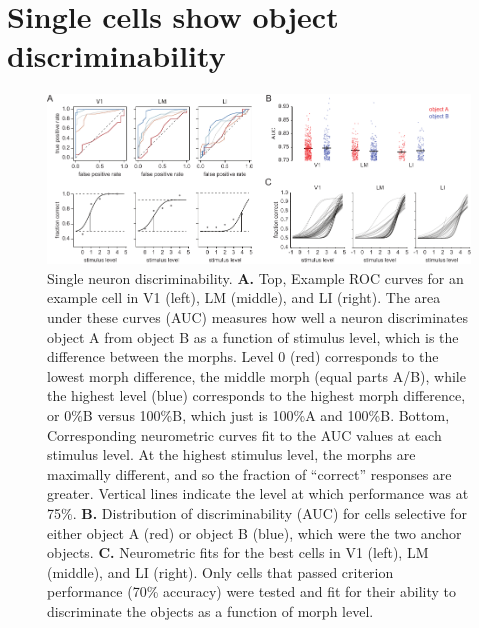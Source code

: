 \section{Single cells show object discriminability}
\begin{figure}[t!]
    \includegraphics[width=\textwidth]{figures/chapter_4/fig_4-3_neurometric/fig_4-3_neurometric.pdf}
    \caption[Single neuron discriminability]{Single neuron discriminability. 
    \textbf{A.} Top, Example ROC curves for an example cell in V1 (left), LM (middle), and LI (right). The area under these curves (AUC) measures how well a neuron discriminates object A from object B as a function of stimulus level, which is the difference between the morphs. Level 0 (red) corresponds to the lowest morph difference, the middle morph (equal parts A/B), while the highest level (blue) corresponds to the highest morph difference, or 0\%B versus 100\%B, which just is 100\%A and 100\%B. Bottom, Corresponding neurometric curves fit to the AUC values at each stimulus level. At the highest stimulus level, the morphs are maximally different, and so the fraction of ``correct'' responses are greater. Vertical lines indicate the level at which performance was at 75\%.
    \textbf{B.} Distribution of discriminability (AUC) for cells selective for either object A (red) or object B (blue), which were the two anchor objects.
    \textbf{C.} Neurometric fits for the best cells in V1 (left), LM (middle), and LI (right). Only cells that passed criterion performance (70\% accuracy) were tested and fit for their ability to discriminate the objects as a function of morph level.
    \label{fig:neurometric}}
\end{figure}

